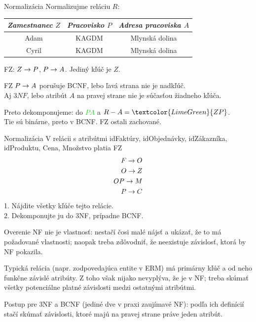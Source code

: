 \documentclass[12pt]{beamer}
\def\green#1{\textcolor{LimeGreen}{#1}}
\begin{document}
\begin{frame}[fragile]{Normalizácia}
Normalizujme reláciu $R$:\\[2mm]
\begin{tabular}{|c|c|c|}
\hline
\emph{Zamestnanec $Z$} & \emph{Pracovisko $P$} & \emph{Adresa pracoviska $A$} \\\hline
Adam & KAGDM & Mlynská dolina \\\hline
Cyril & KAGDM & Mlynská dolina \\\hline
\end{tabular}
\pause

\bigskip
FZ: $Z\rightarrow P$, $P\rightarrow A$. Jediný kľúč je $Z$.

\bigskip
FZ \alert{$P\rightarrow A$} porušuje BCNF, lebo ľavá strana nie je nadkľúč.\\
Aj $3NF$, lebo atribút $A$ na pravej strane nie je súčasťou žiadneho kľúča.

\bigskip
Preto dekomponujeme: do \green{$PA$} a $R - A = \green{ZP}$.\\
Tie sú binárne, preto v BCNF. FZ ostali zachované.
\end{frame}

\begin{frame}[fragile]{Normalizácia}
V relácii s atribútmi idFaktúry, idObjednávky, idZákazníka, idProduktu, Cena, Množstvo platia FZ
\begin{eqnarray*}
F\rightarrow O\\
O\rightarrow Z\\
OP\rightarrow M\\
P\rightarrow C
\end{eqnarray*}
1. Nájdite všetky kľúče tejto relácie.\\
2. Dekomponujte ju do 3NF, prípadne BCNF.
\end{frame}

\begin{frame}[fragile]{Overenie NF}
 nie je  vlastnosť:
nestačí čosi malé nájsť a ukázať, že to má požadované vlastnosti;
naopak treba zdôvodniť, že neexistuje závislosť, ktorá by NF pokazila.
\bigskip

Typická relácia (napr. zodpovedajúca entite v ERM)
má primárny kľúč a od neho funkčne závislé atribúty.
Z toho však nijako nevyplýva, že je v NF; treba skúmať všetky potenciálne platné závislosti
medzi ostatnými atribútmi.
\bigskip

Postup pre 3NF a BCNF (jediné dve v praxi zaujímavé NF):
podľa ich definícií stačí skúmať závislosti, ktoré majú na pravej strane práve jeden atribút.
\end{frame}
\end{document}
